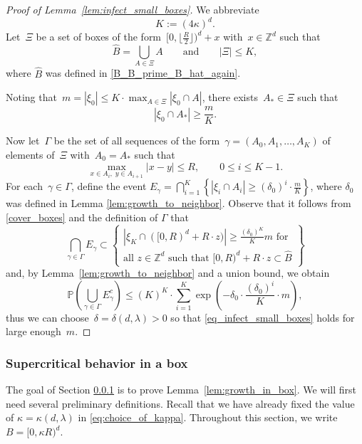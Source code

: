 \documentclass[a4paper,12pt]{article}
\newcommand{\Z}{\mathbb{Z}}
\begin{document}
\begin{proof}[Proof of Lemma~\ref{lem:infect_small_boxes}]
We abbreviate
$$K := (4\kappa)^d.$$
Let~$\Xi$ be a set of boxes of the form~$[0, \lfloor \tfrac{R}{2} \rfloor )^d + x$ with~$x\in \Z^d$ such that
\begin{equation}\label{cover_boxes}
 \widehat{B} = \bigcup_{A \in \Xi} A \qquad \text{and}\qquad |\Xi| \leq K,
 \end{equation}
where $\widehat{B}$ was defined in \eqref{B_B_prime_B_hat_again}.

Noting that~$m = |\xi_0| \leq K\cdot \max_{A \in {\Xi}} |\xi_0 \cap A|$,
there exists~$A_* \in \Xi$ such that
$$|\xi_0 \cap A_*| \geq \frac{m}{K}.$$

Now let~$\Gamma$ be the set of all sequences of the form~$\gamma = (A_0, A_1,\ldots, A_{K})$ of elements of~$\Xi$ with~$A_0 = A_*$ such that
$$
\max_{x \in A_i,\; y \in A_{i+1}} |x-y| \leq R, \qquad 0 \leq i \leq K-1.
$$
For each~$\gamma \in \Gamma$, define the event
$E_\gamma = \bigcap_{i = 1}^{K} \left\{|\xi_{i} \cap A_i| \geq (\delta_0)^i \cdot \frac{m}{K} \right\}$, where $\delta_0$ was defined in Lemma \ref{lem:growth_to_neighbor}.
Observe that it follows from \eqref{cover_boxes} and the definition of $\Gamma$ that
$$\bigcap_{\gamma \in \Gamma} E_\gamma \subset \left\{\begin{array}{l}
|\xi_{K} \cap ([0,R)^d + R\cdot z )| \geq \frac{(\delta_0)^{K}}{K} m \text{ for } \\[.15cm] \text{all~$z \in \Z^d$ such that } [0,R)^d + R\cdot z \subset \widehat{B}
\end{array}\right\}$$
and, by Lemma~\ref{lem:growth_to_neighbor} and a union bound, we obtain
$$\mathbb{P}\left(\bigcup_{\gamma \in \Gamma} E_\gamma^c \right) \leq (K)^{K} \cdot \sum_{i=1}^{K} \exp\left(-\delta_0\cdot \frac{(\delta_0)^i}{K} \cdot m \right),$$
thus we can choose~$\delta=\delta(d,\lambda)>0$  so that \eqref{eq_infect_small_boxes} holds for large enough~$m$.
\end{proof}





\subsubsection{Supercritical behavior in a box}\label{subsub_growth_in_box}

The goal of Section \ref{subsub_growth_in_box} is to prove Lemma~\ref{lem:growth_in_box}.
We will first need several preliminary definitions.
Recall that we have already fixed the value of $\kappa=\kappa(d,\lambda)$ in \eqref{eq:choice_of_kappa}.
Throughout this section, we write
$ B = [0,\kappa R)^d$.
\end{document}
